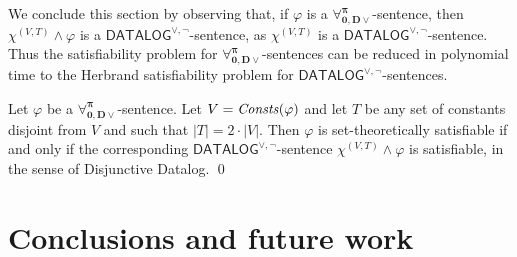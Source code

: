 \documentclass[a4paper]{llncs}
\newcommand{\DisjDatalog}{\ensuremath{\mathsf{DATALOG}^{\vee,\neg}}\xspace}
\newcommand{\ForallpizeroDisjDatalog}{\ensuremath{\mathbf{\forall_{0,D\vee}^{\pi}}}\xspace}
\newcommand{\HExp}{Exp}
\newcommand{\atset}{\mathcal{S}}
\newcommand{\hinter}{\ensuremath{\mathcal{H}}}
\newcommand{\fomodels}[2]{#1 \models_{\mathsf{FO}} #2}
\begin{document}
%
%
We conclude this section by observing that, if $\varphi$ is a
\ForallpizeroDisjDatalog-sentence, then $\chi^{(V,T)} \wedge \varphi$
is a \DisjDatalog-sentence, as $\chi^{(V,T)}$ is a \DisjDatalog-sentence.  Thus
the satisfiability problem for \ForallpizeroDisjDatalog-sentences can
be reduced in polynomial time to the Herbrand satisfiability problem
for \DisjDatalog-sentences.

\begin{corollary}
Let $\varphi$ be a \ForallpizeroDisjDatalog-sentence.  Let
$V=\mathit{Consts}(\varphi)$ and let $T$ be any set of constants disjoint from
$V$ and such that $|T|=2\cdot|V|$.  Then $\varphi$ is
set-theoretically satisfiable if and only if the corresponding
\DisjDatalog-sentence $\chi^{(V,T)} \wedge \varphi$ is satisfiable, in
the sense of Disjunctive Datalog.  \qed
\end{corollary}

\section{Conclusions and future work}\label{CONCLUSIONS}
\end{document}
